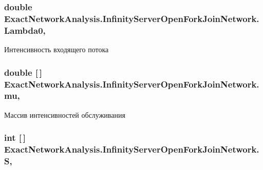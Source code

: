 \subsubsection[{\texorpdfstring{Lambda0}{Lambda0}}]{\setlength{\rightskip}{0pt plus 5cm}double Exact\+Network\+Analysis.\+Infinity\+Server\+Open\+Fork\+Join\+Network.\+Lambda0\hspace{0.3cm}{\ttfamily [get]}, {\ttfamily [set]}}\hypertarget{class_exact_network_analysis_1_1_infinity_server_open_fork_join_network_adaf8966418503408bfe47db8bd365ea1}{}\label{class_exact_network_analysis_1_1_infinity_server_open_fork_join_network_adaf8966418503408bfe47db8bd365ea1}


Интенсивность входящего потока 

\subsubsection[{\texorpdfstring{mu}{mu}}]{\setlength{\rightskip}{0pt plus 5cm}double \mbox{[}$\,$\mbox{]} Exact\+Network\+Analysis.\+Infinity\+Server\+Open\+Fork\+Join\+Network.\+mu\hspace{0.3cm}{\ttfamily [get]}, {\ttfamily [set]}}\hypertarget{class_exact_network_analysis_1_1_infinity_server_open_fork_join_network_aa234d13b5de6baaeae5f10d5e88c0a6b}{}\label{class_exact_network_analysis_1_1_infinity_server_open_fork_join_network_aa234d13b5de6baaeae5f10d5e88c0a6b}


Массив интенсивностей обслуживания 

\subsubsection[{\texorpdfstring{S}{S}}]{\setlength{\rightskip}{0pt plus 5cm}int \mbox{[}$\,$\mbox{]} Exact\+Network\+Analysis.\+Infinity\+Server\+Open\+Fork\+Join\+Network.\+S\hspace{0.3cm}{\ttfamily [get]}, {\ttfamily [set]}}\hypertarget{class_exact_network_analysis_1_1_infinity_server_open_fork_join_network_ac72550bd668cf8677c84d4af4c80d905}{}\label{class_exact_network_analysis_1_1_infinity_server_open_fork_join_network_ac72550bd668cf8677c84d4af4c80d905}


